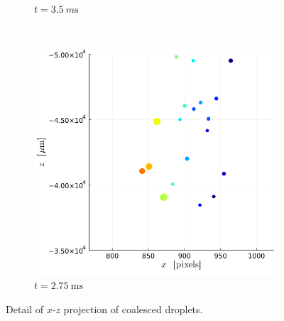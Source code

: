 \begin{figure}[H]
\begin{subfigure}[t]{0.32\linewidth}
        \caption*{$t = \SI{3.5}{m\s}$}
    \end{subfigure}
    \\
    \begin{subfigure}[t]{0.32\linewidth}
        \includegraphics[width=\linewidth]{./Figure/4_Results/exp/xz_detailed_view/out0012.png}
        \caption*{$t = \SI{2.75}{\ms}$}
    \end{subfigure}
    \hspace{0.32\linewidth}
    \caption{Detail of $x$-$z$ projection of coalesced droplets.}
\end{figure}
